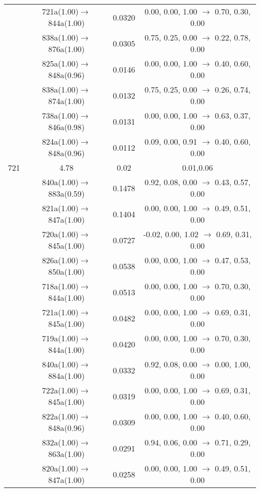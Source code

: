 \documentclass[10pt,a4paper]{article}
\begin{document}
\begin{longtable}{c|c|c|c}
 	& 721a(1.00)$\rightarrow$844a(1.00) &	 0.0320 &	 0.00, 0.00, 1.00 $\rightarrow$ 0.70, 0.30, 0.00 \\ 
 	& 838a(1.00)$\rightarrow$876a(1.00) &	 0.0305 &	 0.75, 0.25, 0.00 $\rightarrow$ 0.22, 0.78, 0.00 \\ 
 	& 825a(1.00)$\rightarrow$848a(0.96) &	 0.0146 &	 0.00, 0.00, 1.00 $\rightarrow$ 0.40, 0.60, 0.00 \\ 
 	& 838a(1.00)$\rightarrow$874a(1.00) &	 0.0132 &	 0.75, 0.25, 0.00 $\rightarrow$ 0.26, 0.74, 0.00 \\ 
 	& 738a(1.00)$\rightarrow$846a(0.98) &	 0.0131 &	 0.00, 0.00, 1.00 $\rightarrow$ 0.63, 0.37, 0.00 \\ 
 	& 824a(1.00)$\rightarrow$848a(0.96) &	 0.0112 &	 0.09, 0.00, 0.91 $\rightarrow$ 0.40, 0.60, 0.00 \\ 
 \hline721 &	 4.78 &	 0.02 &	 0.01,0.06 \\ 
  	& 840a(1.00)$\rightarrow$883a(0.59) &	 0.1478 &	 0.92, 0.08, 0.00 $\rightarrow$ 0.43, 0.57, 0.00 \\ 
 	& 821a(1.00)$\rightarrow$847a(1.00) &	 0.1404 &	 0.00, 0.00, 1.00 $\rightarrow$ 0.49, 0.51, 0.00 \\ 
 	& 720a(1.00)$\rightarrow$845a(1.00) &	 0.0727 &	 -0.02, 0.00, 1.02 $\rightarrow$ 0.69, 0.31, 0.00 \\ 
 	& 826a(1.00)$\rightarrow$850a(1.00) &	 0.0538 &	 0.00, 0.00, 1.00 $\rightarrow$ 0.47, 0.53, 0.00 \\ 
 	& 718a(1.00)$\rightarrow$844a(1.00) &	 0.0513 &	 0.00, 0.00, 1.00 $\rightarrow$ 0.70, 0.30, 0.00 \\ 
 	& 721a(1.00)$\rightarrow$845a(1.00) &	 0.0482 &	 0.00, 0.00, 1.00 $\rightarrow$ 0.69, 0.31, 0.00 \\ 
 	& 719a(1.00)$\rightarrow$844a(1.00) &	 0.0420 &	 0.00, 0.00, 1.00 $\rightarrow$ 0.70, 0.30, 0.00 \\ 
 	& 840a(1.00)$\rightarrow$884a(1.00) &	 0.0332 &	 0.92, 0.08, 0.00 $\rightarrow$ 0.00, 1.00, 0.00 \\ 
 	& 722a(1.00)$\rightarrow$845a(1.00) &	 0.0319 &	 0.00, 0.00, 1.00 $\rightarrow$ 0.69, 0.31, 0.00 \\ 
 	& 822a(1.00)$\rightarrow$848a(0.96) &	 0.0309 &	 0.00, 0.00, 1.00 $\rightarrow$ 0.40, 0.60, 0.00 \\ 
 	& 832a(1.00)$\rightarrow$863a(1.00) &	 0.0291 &	 0.94, 0.06, 0.00 $\rightarrow$ 0.71, 0.29, 0.00 \\ 
 	& 820a(1.00)$\rightarrow$847a(1.00) &	 0.0258 &	 0.00, 0.00, 1.00 $\rightarrow$ 0.49, 0.51, 0.00 \\ 

\end{longtable}
\end{document}
